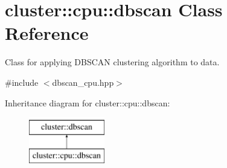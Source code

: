 \hypertarget{classcluster_1_1cpu_1_1dbscan}{}\section{cluster\+:\+:cpu\+:\+:dbscan Class Reference}
\label{classcluster_1_1cpu_1_1dbscan}


Class for applying D\+B\+S\+C\+A\+N clustering algorithm to data.  




{\ttfamily \#include $<$dbscan\+\_\+cpu.\+hpp$>$}

Inheritance diagram for cluster\+:\+:cpu\+:\+:dbscan\+:\begin{figure}[H]
\begin{center}
\leavevmode
\includegraphics[height=2.000000cm]{classcluster_1_1cpu_1_1dbscan}
\end{center}
\end{figure}
